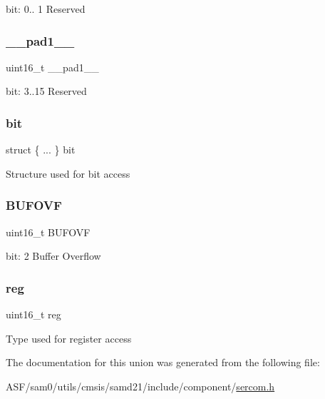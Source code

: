 bit\+: 0.. 1 Reserved \mbox{\label{union_s_e_r_c_o_m___s_p_i___s_t_a_t_u_s___type_ab72e3a1f2f7db8695c60c658f5a0f11a}} 
\subsubsection{\texorpdfstring{\_\_pad1\_\_}{\_\_pad1\_\_}}
{\footnotesize\ttfamily uint16\+\_\+t \+\_\+\+\_\+pad1\+\_\+\+\_\+}

bit\+: 3..15 Reserved \mbox{\label{union_s_e_r_c_o_m___s_p_i___s_t_a_t_u_s___type_aa7f1e6f29755352f3ad11f2b74920d20}} 
\subsubsection{\texorpdfstring{bit}{bit}}
{\footnotesize\ttfamily struct \{ ... \}   bit}

Structure used for bit access \mbox{\label{union_s_e_r_c_o_m___s_p_i___s_t_a_t_u_s___type_ac1d0751d41834397720be435a519c291}} 
\subsubsection{\texorpdfstring{BUFOVF}{BUFOVF}}
{\footnotesize\ttfamily uint16\+\_\+t B\+U\+F\+O\+VF}

bit\+: 2 Buffer Overflow \mbox{\label{union_s_e_r_c_o_m___s_p_i___s_t_a_t_u_s___type_a11760f5020019f4aa8cb02e694f7cc44}} 
\subsubsection{\texorpdfstring{reg}{reg}}
{\footnotesize\ttfamily uint16\+\_\+t reg}

Type used for register access 

The documentation for this union was generated from the following file\+:\begin{DoxyCompactItemize}
\item 
A\+S\+F/sam0/utils/cmsis/samd21/include/component/\mbox{\hyperlink{utils_2cmsis_2samd21_2include_2component_2sercom_8h}{sercom.\+h}}\end{DoxyCompactItemize}
